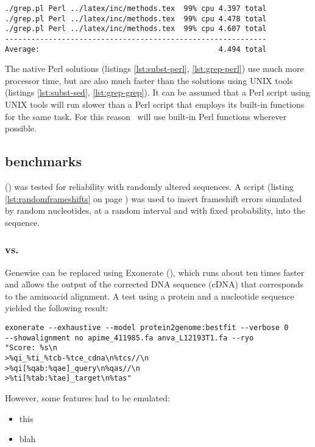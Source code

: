 \begin{verbatim}
./grep.pl Perl ../latex/inc/methods.tex  99% cpu 4.397 total
./grep.pl Perl ../latex/inc/methods.tex  99% cpu 4.478 total
./grep.pl Perl ../latex/inc/methods.tex  99% cpu 4.607 total
------------------------------------------------------------
Average:                                         4.494 total
\end{verbatim}

The native Perl solutions (listings \ref{lst:subst-perl}, \ref{lst:grep-perl})
use much more processor time, but are also much faster than the solutions using
UNIX tools (listings \ref{lst:subst-sed}, \ref{lst:grep-grep}). It can be
assumed that a Perl script using UNIX tools will run slower than a Perl script
that employs its built-in functions for the same task. For this reason
\pname~will use built-in Perl functions wherever possible.

\subsection{ benchmarks}
 (\cite{Birney2004}) was tested for reliability with randomly
altered sequences. A script (listing \ref{lst:randomframeshifts} on page
\pageref{lst:randomframeshifts}) was used to insert frameshift errors simulated
by random nucleotides, at a random interval and with fixed probability, into
the sequence. 

\subsubsection{ vs. }
Genewise can be replaced using Exonerate (\cite{Slater2005}),
which runs about ten times faster and allows the output of the corrected DNA
sequence (cDNA) that corresponds to the aminoacid alignment. A test using a
protein and a nucleotide sequence yielded the following result:

\begin{verbatim}
exonerate --exhaustive --model protein2genome:bestfit --verbose 0 
--showalignment no apime_411985.fa anva_L12193T1.fa --ryo 
"Score: %s\n
>%qi_%ti_%tcb-%tce_cdna\n%tcs//\n
>%qi[%qab:%qae]_query\n%qas//\n
>%ti[%tab:%tae]_target\n%tas" 
\end{verbatim}

However, some features had to be emulated: 

\begin{itemize}
\item this
\item blah
\end{itemize}

